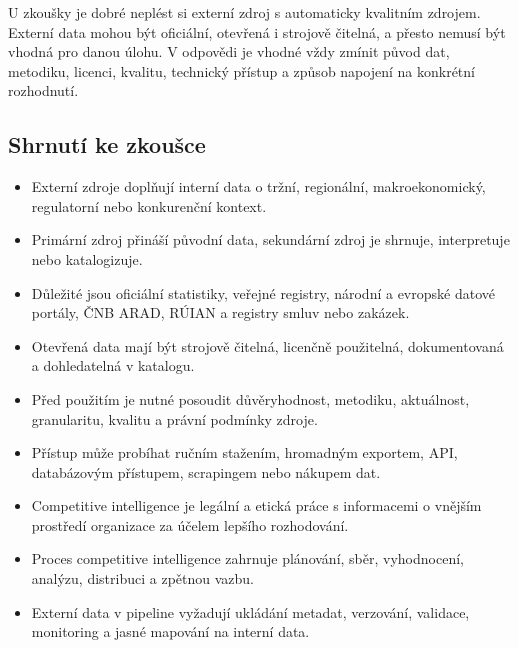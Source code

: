 \pozor
U zkoušky je dobré neplést si externí zdroj s automaticky kvalitním zdrojem. Externí data mohou být
oficiální, otevřená i strojově čitelná, a přesto nemusí být vhodná pro danou úlohu. V odpovědi je
vhodné vždy zmínit původ dat, metodiku, licenci, kvalitu, technický přístup a způsob napojení na
konkrétní rozhodnutí.

\subsection{Shrnutí ke zkoušce}
\begin{itemize}
  \item Externí zdroje doplňují interní data o tržní, regionální, makroekonomický, regulatorní nebo
  konkurenční kontext.
  \item Primární zdroj přináší původní data, sekundární zdroj je shrnuje, interpretuje nebo katalogizuje.
  \item Důležité jsou oficiální statistiky, veřejné registry, národní a evropské datové portály,
  ČNB ARAD, RÚIAN a registry smluv nebo zakázek.
  \item Otevřená data mají být strojově čitelná, licenčně použitelná, dokumentovaná a dohledatelná
  v katalogu.
  \item Před použitím je nutné posoudit důvěryhodnost, metodiku, aktuálnost, granularitu, kvalitu
  a právní podmínky zdroje.
  \item Přístup může probíhat ručním stažením, hromadným exportem, API, databázovým přístupem,
  scrapingem nebo nákupem dat.
  \item Competitive intelligence je legální a etická práce s informacemi o vnějším prostředí
  organizace za účelem lepšího rozhodování.
  \item Proces competitive intelligence zahrnuje plánování, sběr, vyhodnocení, analýzu, distribuci
  a zpětnou vazbu.
  \item Externí data v pipeline vyžadují ukládání metadat, verzování, validace, monitoring a jasné
  mapování na interní data.
\end{itemize}

